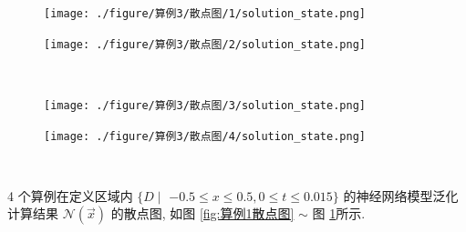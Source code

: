 \documentclass{Sichuan Normal University}
\begin{document}
\begin{figure}[H]
    \centering
    \begin{minipage}[c]{0.48\textwidth}
    \centering
    \texttt{[image: ./figure/算例3/散点图/1/solution\_state.png]}
    \end{minipage}
    \hspace{0.02\textwidth}
    \begin{minipage}[c]{0.48\textwidth}
    \centering
    \texttt{[image: ./figure/算例3/散点图/2/solution\_state.png]}
    \end{minipage}\\[3mm]
    \begin{minipage}[t]{0.48\textwidth}
    \centering
    \label{fig:算例1散点图}
    \end{minipage}
    \hspace{0.02\textwidth}
    \begin{minipage}[t]{0.48\textwidth}
    \centering
    \label{fig:算例2散点图}
    \end{minipage}
    \centering
    \begin{minipage}[c]{0.48\textwidth}
    \centering
    \texttt{[image: ./figure/算例3/散点图/3/solution\_state.png]}
    \end{minipage}
    \hspace{0.02\textwidth}
    \begin{minipage}[c]{0.48\textwidth}
    \centering
    \texttt{[image: ./figure/算例3/散点图/4/solution\_state.png]}
    \end{minipage}\\[3mm]
    \begin{minipage}[t]{0.48\textwidth}
    \centering
    \label{fig:算例3散点图}
    \end{minipage}
    \hspace{0.02\textwidth}
    \begin{minipage}[t]{0.48\textwidth}
    \centering
    \label{fig:算例4散点图}
    \end{minipage}
    \end{figure}

4 个算例在定义区域内 $\{D \mid$ $-0.5 \leqslant x \leqslant 0.5,0 \leqslant t \leqslant 0.015\}$ 的神经网络模型泛化计算结果 $\mathcal{N}(\vec{x})$ 的散点图, 如图 \ref{fig:算例1散点图} $\sim$ 图 \ref{fig:算例4散点图}所示.
\end{document}
